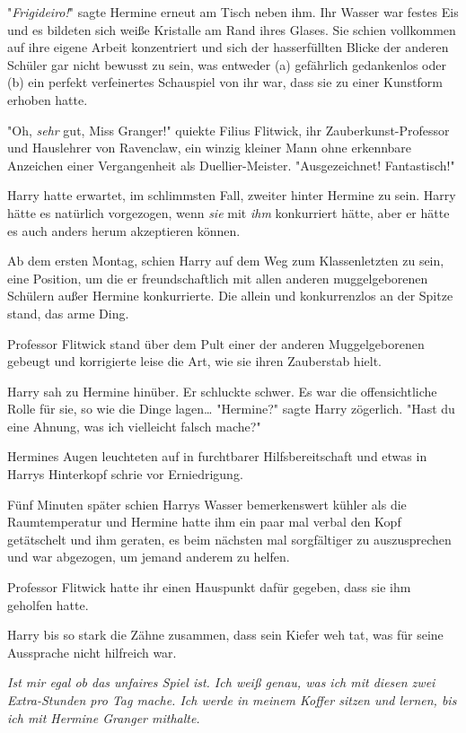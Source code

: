 {"\emph{Frigideiro!}" sagte Hermine erneut am Tisch neben ihm. Ihr Wasser war festes Eis und es bildeten sich weiße Kristalle am Rand ihres Glases. Sie schien vollkommen auf ihre eigene Arbeit konzentriert und sich der hasserfüllten Blicke der anderen Schüler gar nicht bewusst zu sein, was entweder (a) gefährlich gedankenlos oder (b) ein perfekt verfeinertes Schauspiel von ihr war, dass sie zu einer Kunstform erhoben hatte.

"Oh, \emph{sehr} gut, Miss Granger!" quiekte Filius Flitwick, ihr Zauberkunst-Professor und Hauslehrer von Ravenclaw, ein winzig kleiner Mann ohne erkennbare Anzeichen einer Vergangenheit als Duellier-Meister. "Ausgezeichnet! Fantastisch!"

Harry hatte erwartet, im schlimmsten Fall, zweiter hinter Hermine zu sein. Harry hätte es natürlich vorgezogen, wenn \emph{sie} mit \emph{ihm} konkurriert hätte, aber er hätte es auch anders herum akzeptieren können.

Ab dem ersten Montag, schien Harry auf dem Weg zum Klassenletzten zu sein, eine Position, um die er freundschaftlich mit allen anderen muggelgeborenen Schülern außer Hermine konkurrierte. Die allein und konkurrenzlos an der Spitze stand, das arme Ding.

Professor Flitwick stand über dem Pult einer der anderen Muggelgeborenen gebeugt und korrigierte leise die Art, wie sie ihren Zauberstab hielt.

Harry sah zu Hermine hinüber. Er schluckte schwer. Es war die offensichtliche Rolle für sie, so wie die Dinge lagen… "Hermine?" sagte Harry zögerlich. "Hast du eine Ahnung, was ich vielleicht falsch mache?"

Hermines Augen leuchteten auf in furchtbarer Hilfsbereitschaft und etwas in Harrys Hinterkopf schrie vor Erniedrigung.

Fünf Minuten später schien Harrys Wasser bemerkenswert kühler als die Raumtemperatur und Hermine hatte ihm ein paar mal verbal den Kopf getätschelt und ihm geraten, es beim nächsten mal sorgfältiger zu auszusprechen und war abgezogen, um jemand anderem zu helfen.

Professor Flitwick hatte ihr einen Hauspunkt dafür gegeben, dass sie ihm geholfen hatte.

Harry bis so stark die Zähne zusammen, dass sein Kiefer weh tat, was für seine Aussprache nicht hilfreich war.

\emph{Ist mir egal ob das unfaires Spiel ist. Ich weiß genau, was ich mit diesen zwei Extra-Stunden pro Tag mache. Ich werde in meinem Koffer sitzen und lernen, bis ich mit Hermine Granger mithalte.}

}
